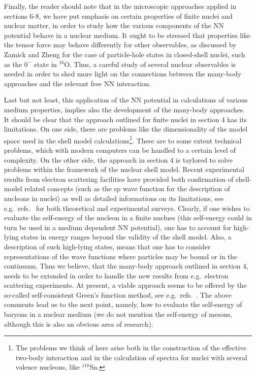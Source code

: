 \begin{itemize}
Finally, the reader should note that in the microscopic
approaches applied in sections 6-8,
we have put emphasis on certain properties
of finite nuclei and nuclear matter, in order to study how the various
components of the NN potential behave in a nuclear medium.
It ought to be stressed that properties like the tensor
force may behave differently for other observables,
as discussed by Zamick and Zheng \cite{zz94} for the
case of particle-hole states in closed-shell nuclei,
such as the $0^{-}$ state in $^{16}$O. Thus, a careful
study of several nuclear observables is needed in order
to shed more light on the connections between the many-body
approaches and the relevant free NN interaction.

Last but not least, this application of the NN potential
in calculations of various medium properties,
implies also the development
of the many-body approaches.  It should be clear that the approach
outlined for finite nuclei in section 4 has its limitations. On one side,
there are problems like the dimensionality of the model space used
in the shell model calculations\footnote{The problems we think of here
arise both in the construction of the effective two-body interaction
and in the calculation of spectra for nuclei with several valence nucleons,
like $^{110}$Sn.}.
These are to some extent technical problems, which with modern
computers can be handled to a certain level of complexity.
On the other side, the approach
in section 4 is taylored to solve problems within the framework of
the nuclear shell model.
Recent experimental results from electron scattering
facilities have provided both
confirmation of shell-model related concepts (such as the
sp wave function for the description of nucleons in nuclei)
as well as detailed informations on its limitations, see e.g.\ refs.\
\cite{ms91,frois,exp} for both theoretical and experimental surveys.
Clearly, if one wishes to evaluate the self-energy of the nucleon in
a finite nuclues (this self-energy could in turn be used
in a medium dependent NN potential), one has to account for high-lying
states in energy ranges beyond the
validity of the shell model. Also, a description of such high-lying states,
means that one has to consider representations of the wave
functions where particles may be bound or in the continuum.
Thus we believe, that the many-body approach outlined in section 4, needs to be
extended in order to handle the new results from e.g.\ electron scattering
experiments. At present, a viable approach seems to be 
offered by the so-called self-consistent Green's function method, see e.g.\
refs.\ \cite{dm92,rpd89,dickhoff94}.
The above comments lead us to the next point, namely, how to evaluate the 
self-energy of baryons in a nuclear medium (we do not mention the self-energy
of mesons, although this is also an obvious area of research).


\end{itemize}
